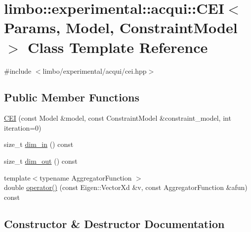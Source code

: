 \hypertarget{classlimbo_1_1experimental_1_1acqui_1_1_c_e_i}{}\section{limbo\+:\+:experimental\+:\+:acqui\+:\+:C\+E\+I$<$ Params, Model, Constraint\+Model $>$ Class Template Reference}
\label{classlimbo_1_1experimental_1_1acqui_1_1_c_e_i}


{\ttfamily \#include $<$limbo/experimental/acqui/cei.\+hpp$>$}

\subsection*{Public Member Functions}
\begin{DoxyCompactItemize}
\item 
\hyperlink{classlimbo_1_1experimental_1_1acqui_1_1_c_e_i_a5418a21dc4d1d98b6099799d84e48486}{C\+E\+I} (const Model \&model, const Constraint\+Model \&constraint\+\_\+model, int iteration=0)
\item 
size\+\_\+t \hyperlink{classlimbo_1_1experimental_1_1acqui_1_1_c_e_i_a096fc8105829ffc2d4fffc8df7dead01}{dim\+\_\+in} () const 
\item 
size\+\_\+t \hyperlink{classlimbo_1_1experimental_1_1acqui_1_1_c_e_i_aa82f5ffd825faa8df476d46f58fb9e48}{dim\+\_\+out} () const 
\item 
{\footnotesize template$<$typename Aggregator\+Function $>$ }\\double \hyperlink{classlimbo_1_1experimental_1_1acqui_1_1_c_e_i_a225353e2dad5fdbdc172a951fe317c61}{operator()} (const Eigen\+::\+Vector\+Xd \&v, const Aggregator\+Function \&afun) const 
\end{DoxyCompactItemize}


\subsection{Constructor \& Destructor Documentation}
\hypertarget{classlimbo_1_1experimental_1_1acqui_1_1_c_e_i_a5418a21dc4d1d98b6099799d84e48486}{}
